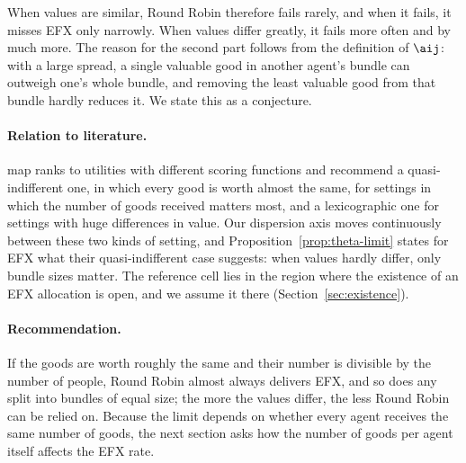 When values are similar, Round Robin therefore fails rarely, and when it fails, it misses EFX
only narrowly. When values differ greatly, it fails more often and by much more. The
reason for the second part follows from the definition of $\aij$: with a large spread, a single
valuable good in another agent's bundle can outweigh one's whole bundle, and removing the least
valuable good from that bundle hardly reduces it. We state this as a conjecture.

\paragraph{Relation to literature.}
\textcite[p.~74]{bouveret2011} map ranks to utilities with different scoring functions and
recommend a quasi-indifferent one, in which every good is worth almost the same, for settings in
which the number of goods received matters most, and a lexicographic one for settings with huge
differences in value. Our dispersion axis moves continuously between these two kinds of setting,
and Proposition~\ref{prop:theta-limit} states for EFX what their quasi-indifferent case suggests:
when values hardly differ, only bundle sizes matter. The reference cell lies in the region where
the existence of an EFX allocation is open, and we assume it there
(Section~\ref{sec:existence}).

\paragraph{Recommendation.}
If the goods are worth roughly the same and their number is divisible by the number of people,
Round Robin almost always delivers EFX, and so does any split into bundles of equal size; the
more the values differ, the less Round Robin can be relied on. Because the limit depends on
whether every agent receives the same number of goods, the next section asks how the number of
goods per agent itself affects the EFX rate.
